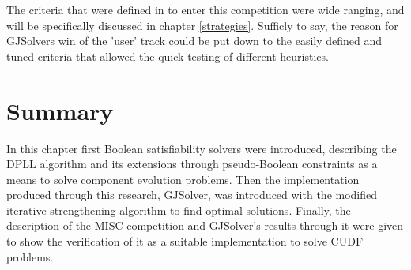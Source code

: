 The criteria that were defined in to enter this competition were wide ranging, and will be specifically discussed in chapter \ref{strategies}.
Sufficly to say, the reason for GJSolvers win of the 'user' track could be put down to the easily defined and tuned criteria that allowed the quick testing of different heuristics.




\section{Summary}
In this chapter first Boolean satisfiability solvers were introduced, 
describing the DPLL algorithm and its extensions through pseudo-Boolean constraints as a means to solve component evolution problems.
Then the implementation produced through this research, GJSolver, was introduced with the modified iterative strengthening algorithm to find optimal solutions.
Finally, the description of the MISC competition and GJSolver's results through it were given to show the verification of it as a suitable implementation to solve CUDF problems.

